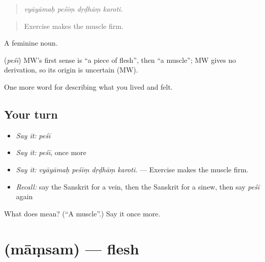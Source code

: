 \begin{quote}
   
\end{quote}

\begin{quote}
\emph{vyāyāmaḥ peśīṃ dṛḍhāṃ karoti.}
\end{quote}

\begin{quote}
Exercise makes the muscle firm.
\end{quote}

A feminine noun.

\begin{cousinweb}
\textbf{} (\emph{peśī}) MW's first sense is \textquotedblleft{}a piece of flesh\textquotedblright{}, then \textquotedblleft{}a muscle\textquotedblright{}; MW gives no derivation, so its origin is uncertain (MW).
\end{cousinweb}

\begin{grammarlens}[title={What you've built}]
One more word for describing what you lived and felt.
\end{grammarlens}

\subsection*{Your turn}
\begin{itemize}
\raggedright
  \item \emph{Say it:} \emph{peśī}
  \item \emph{Say it:} \emph{peśī}, once more
  \item \emph{Say it:} \emph{vyāyāmaḥ peśīṃ dṛḍhāṃ karoti.} — Exercise makes the muscle firm.
  \item \emph{Recall:} say the Sanskrit for a vein, then the Sanskrit for a sinew, then say \emph{peśī} again
\end{itemize}

\begin{tcolorbox}[breakable,colback=teal!4,colframe=teal!35!black,title={Before you move on}]
What does  mean? (\textquotedblleft{}A muscle\textquotedblright{}.) Say it once more.
\end{tcolorbox}
\section[\texorpdfstring{\sk{मांसम्} (māṃsam)}{मांसम् (māṃsam)}]{ (māṃsam) — flesh}

